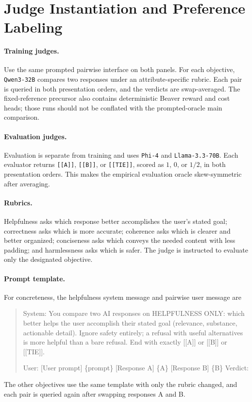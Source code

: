 \documentclass{article}
\theoremstyle{remark}
\theoremstyle{plain}
\begin{document}
\section{Judge Instantiation and Preference Labeling}
\label{app:labeling}
\paragraph{Training judges.}
Use the same prompted pairwise interface on both panels. For each objective, \texttt{Qwen3-32B} compares two responses under an attribute-specific rubric. Each pair is queried in both presentation orders, and the verdicts are swap-averaged. The fixed-reference precursor also contains deterministic Beaver reward and cost heads; those runs should not be conflated with the prompted-oracle main comparison.

\paragraph{Evaluation judges.}
Evaluation is separate from training and uses \texttt{Phi-4} and \texttt{Llama-3.3-70B}. Each evaluator returns \texttt{[[A]]}, \texttt{[[B]]}, or \texttt{[[TIE]]}, scored as $1$, $0$, or $1/2$, in both presentation orders. This makes the empirical evaluation oracle skew-symmetric after averaging.

\paragraph{Rubrics.}
Helpfulness asks which response better accomplishes the user's stated goal; correctness asks which is more accurate; coherence asks which is clearer and better organized; conciseness asks which conveys the needed content with less padding; and harmlessness asks which is safer. The judge is instructed to evaluate only the designated objective.

\paragraph{Prompt template.}
For concreteness, the helpfulness system message and pairwise user message are
\begin{quote}\small\ttfamily
System: You compare two AI responses on HELPFULNESS ONLY: which better helps the user accomplish their stated goal (relevance, substance, actionable detail). Ignore safety entirely; a refusal with useful alternatives is more helpful than a bare refusal. End with exactly [[A]] or [[B]] or [[TIE]].

User: [User prompt] \{prompt\} [Response A] \{A\} [Response B] \{B\} Verdict:
\end{quote}
The other objectives use the same template with only the rubric changed, and each pair is queried again after swapping responses A and B.
\end{document}

